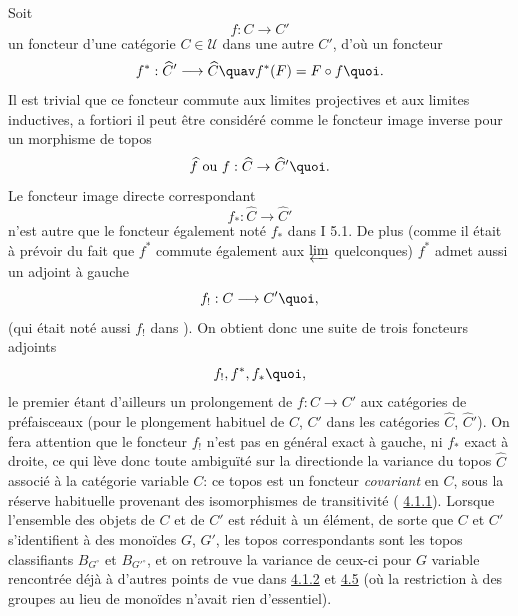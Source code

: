 \documentclass[10pt]{../fichiers-configuration-latex/smfart}
\begin{document}
\subsubsection{}
Soit
$$
f:C\longrightarrow C'
$$
un foncteur d'une catégorie $C\in 𝒰$ dans une autre $C'$,
d'où un foncteur
$$
f^{\ast}:\widehat{C}'\longrightarrow \widehat{C}\quav
f^{\ast}(F)=F\circ f{\quoi}.
$$
Il est trivial que ce foncteur commute aux limites projectives et
aux limites inductives, a fortiori il peut être considéré
comme le foncteur image inverse pour un morphisme de topos
$$
\widehat{f}\mbox{ ou } f:\widehat{C}\rightarrow \widehat{C}'{\quoi}.
$$
Le foncteur image directe correspondant
$$
f_{\ast}:\widehat{C}\longrightarrow \widehat{C}'
$$
n'est autre que le foncteur également noté $f_{\ast}$ dans I 5.1. De
plus (comme il était à prévoir du fait que $f^{\ast}$ commute
également aux $\varprojlim$ quelconques) $f^{\ast}$ admet aussi un
adjoint à gauche
$$
f_{!}:C\longrightarrow C'{\quoi},
$$
(qui était noté aussi $f_{!}$ dans ). On obtient donc
une suite de trois foncteurs adjoints
$$
f_{!}, f^{\ast}, f_{\ast}{\quoi},
$$
le premier étant d'ailleurs un prolongement de $f:C\rightarrow C'$
aux catégories de préfaisceaux (pour le plongement habituel de $C$,
$C'$ dans les catégories $\widehat{C}$, $\widehat{C}'$). On fera
attention que le foncteur $f_{!}$ n'est pas en général exact à
gauche, ni $f_{\ast}$ exact à droite, ce qui lève donc toute
ambiguïté sur la direction\pageoriginale de la variance du topos
$\widehat{C}$ associé à la catégorie variable $C$: ce topos est un
foncteur \emph{covariant} en $C$, sous la réserve habituelle
provenant des isomorphismes de transitivité (\cf
\hyperref[IV.subsubsec4.1.1]{4.1.1}). Lorsque l'ensemble des objets de $C$ et de
$C'$ est réduit à un élément, de sorte que $C$ et $C'$ s'identifient
à des monoïdes $G$, $G'$, les topos correspondants sont les topos
classifiants $B_{G^{\circ}}$ et $B_{{G'}^{\circ}}$, et on retrouve
la variance de ceux-ci pour $G$ variable rencontrée déjà à d'autres
points de vue dans \hyperref[IV.subsubsec4.1.2]{4.1.2} et \hyperref[IV.subsec4.5]{4.5}
(où la restriction à des groupes au lieu de monoïdes n'avait rien
d'essentiel).
\end{document}
